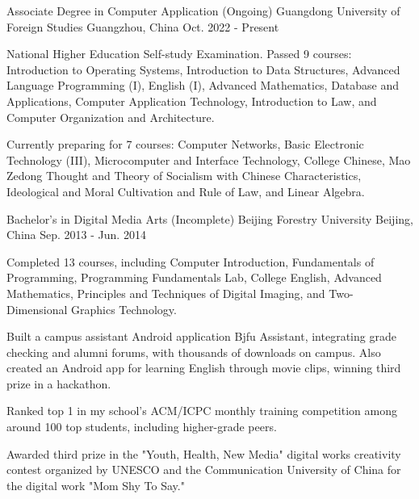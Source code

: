 

\begin{cventries}

  \cventry
    {Associate Degree in Computer Application (Ongoing)} %
    {Guangdong University of Foreign Studies} %
    {Guangzhou, China} %
    {Oct. 2022 - Present} %
    {
      \begin{cvitems} %
        \item {National Higher Education Self-study Examination. Passed 9 courses: Introduction to Operating Systems, Introduction to Data Structures, Advanced Language Programming (I), English (I), Advanced Mathematics, Database and Applications, Computer Application Technology, Introduction to Law, and Computer Organization and Architecture.}
        \item {Currently preparing for 7 courses: Computer Networks, Basic Electronic Technology (III), Microcomputer and Interface Technology, College Chinese, Mao Zedong Thought and Theory of Socialism with Chinese Characteristics, Ideological and Moral Cultivation and Rule of Law, and Linear Algebra.}
      \end{cvitems}
    }
  \cventry
    {Bachelor’s in Digital Media Arts (Incomplete)} %
    {Beijing Forestry University} %
    {Beijing, China} %
    {Sep. 2013 - Jun. 2014} %
    {
      \begin{cvitems} %
        \item {Completed 13 courses, including Computer Introduction, Fundamentals of Programming, Programming Fundamentals Lab, College English, Advanced Mathematics, Principles and Techniques of Digital Imaging, and Two-Dimensional Graphics Technology.}
        \item {Built a campus assistant Android application Bjfu Assistant, integrating grade checking and alumni forums, with thousands of downloads on campus. Also created an Android app for learning English through movie clips, winning third prize in a hackathon.}
        \item {Ranked top 1 in my school's ACM/ICPC monthly training competition among around 100 top students, including higher-grade peers.}
        \item {Awarded third prize in the "Youth, Health, New Media" digital works creativity contest organized by UNESCO and the Communication University of China for the digital work "Mom Shy To Say."}
      \end{cvitems}
    }


\end{cventries}
